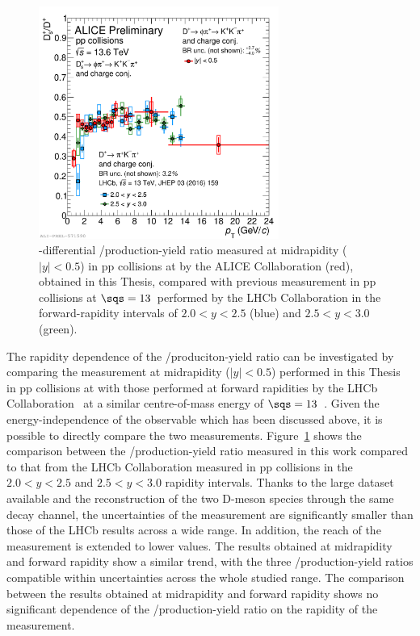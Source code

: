\begin{figure}[tb]
    \centering
    \includegraphics[width=0.7\textwidth]{Figures/Chapter 7/dsoverdpluscomparisonlhcb.pdf}
    \caption{\pt-differential \ds/\dpl production-yield ratio measured at midrapidity ($\lvert y\rvert<0.5$) in pp collisions at \thirteen by the ALICE Collaboration (red), obtained in this Thesis, compared with previous measurement in pp collisions at $\sqs=13$~\tev performed by the LHCb Collaboration in the forward-rapidity intervals of $2.0<y<2.5$ (blue) and $2.5<y<3.0$ (green).}
    \label{fig:dsdplvsrapidity}
\end{figure}

The rapidity dependence of the \ds/\dpl produciton-yield ratio can be investigated by comparing the measurement at midrapidity ($\lvert y\rvert<0.5$) performed in this Thesis in pp collisions at \thirteen with those performed at forward rapidities by the LHCb Collaboration~\cite{LHCb:2015swx} at a similar centre-of-mass energy of $\sqs=13$~\tev. Given the energy-independence of the observable which has been discussed above, it is possible to directly compare the two measurements. Figure~\ref{fig:dsdplvsrapidity} shows the comparison between the \ds/\dpl production-yield ratio measured in this work compared to that from the LHCb Collaboration measured in pp collisions in the $2.0<y<2.5$ and $2.5<y<3.0$ rapidity intervals. Thanks to the large dataset available and the reconstruction of the two D-meson species through the same decay channel, the uncertainties of the measurement are significantly smaller than those of the LHCb results across a wide \pt range. In addition, the \pt reach of the measurement is extended to lower values. The results obtained at midrapidity and forward rapidity show a similar trend, with the three \ds/\dpl production-yield ratios compatible within uncertainties across the whole studied \pt range. The comparison between the results obtained at midrapidity and forward rapidity shows no significant dependence of the \ds/\dpl production-yield ratio on the rapidity of the measurement.


